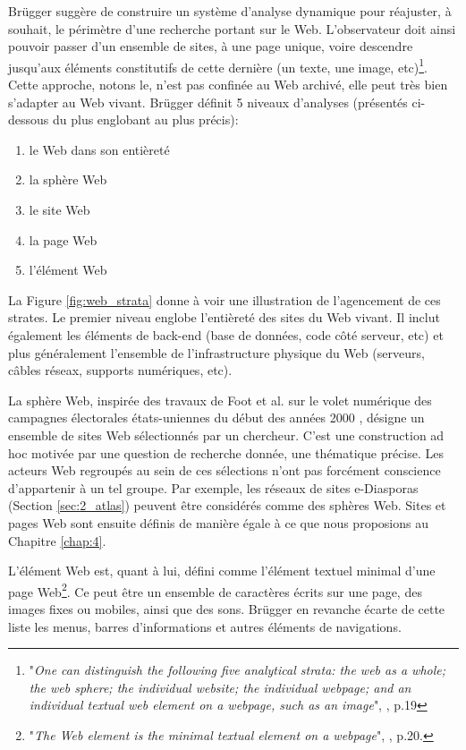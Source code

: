 \documentclass[symmetric,justified,marginals=raggedouter]{tufte-book}
\begin{document}
Brügger suggère de construire un système d'analyse dynamique pour réajuster, à souhait, le périmètre d'une recherche portant sur le Web. L'observateur doit ainsi pouvoir passer d'un ensemble de sites, à une page unique, voire descendre jusqu'aux éléments constitutifs de cette dernière (un texte, une image, etc)\footnote{"\textit{One can distinguish the following five analytical strata: the web as a whole; the web sphere; the individual website; the individual webpage; and an individual textual web element on a webpage, such as an image}", \citep{brugger_website_2009}, p.19}. 
Cette approche, notons le, n'est pas confinée au Web archivé, elle peut très bien s'adapter au Web vivant. Brügger définit 5 niveaux d'analyses (présentés ci-dessous du plus englobant au plus précis):

\begin{enumerate}
\setlength\itemsep{0em}
\item le Web dans son entièreté 
\item la sphère Web
\item le site Web
\item la page Web
\item l'élément Web
\end{enumerate} 

\par\noindent La Figure \ref{fig:web_strata} donne à voir une illustration de l'agencement de ces strates. Le premier niveau englobe l'entièreté des sites du Web vivant. Il inclut également les éléments de back-end (base de données, code côté serveur, etc) et plus généralement l'ensemble de l'infrastructure physique du Web (serveurs, câbles réseax, supports numériques, etc).

La sphère Web, inspirée des travaux de Foot et al. sur le volet numérique des campagnes électorales états-uniennes du début des années 2000 \citep{foot_web_2006}, désigne un ensemble de sites Web sélectionnés par un chercheur. C'est une construction ad hoc motivée par une question de recherche donnée, une thématique précise. Les acteurs Web regroupés au sein de ces sélections n'ont pas forcément conscience d'appartenir à un tel groupe. Par exemple, les réseaux de sites e-Diasporas (Section \ref{sec:2_atlas}) peuvent être considérés comme des sphères Web. Sites et pages Web sont ensuite définis de manière égale à ce que nous proposions au Chapitre \ref{chap:4}.

L'élément Web est, quant à lui, défini comme l'élément textuel minimal d'une page Web\footnote{"\textit{The Web element is the minimal textual element on a webpage}", \citep{brugger_website_2009}, p.20.}. Ce peut être un ensemble de caractères écrits sur une page, des images fixes ou mobiles, ainsi que des sons. Brügger en revanche écarte de cette liste les menus, barres d'informations et autres éléments de navigations. 
\end{document}
